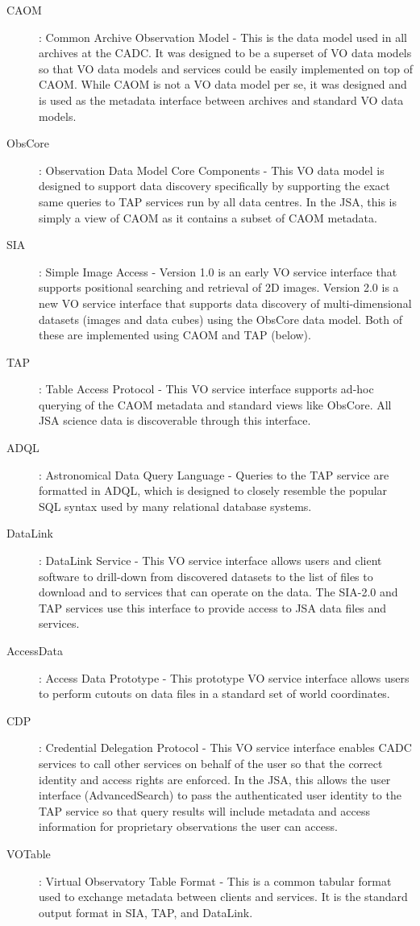 \documentclass[final,authoryear,5p,times,twocolumn]{elsarticle}
\begin{document}
\begin{description}
\item[CAOM] : Common Archive Observation Model - This is the data model
used in all archives at the CADC. It was designed to be a superset
of VO data models so that VO data models and services could be easily
implemented on top of CAOM. While CAOM is not a VO data model per se,
it was designed and is used as the metadata interface between archives
and standard VO data models. \citep{2007ASPC..376..347D}
\item[ObsCore] : Observation Data Model Core Components - This VO data model
is designed to support data discovery specifically by supporting the
exact same queries to TAP services run by all data centres. In the JSA,
this is simply a view of CAOM as it contains a subset of CAOM metadata. \citep{obscore}
\item[SIA] : Simple Image Access - Version 1.0 is an early VO service
interface that supports positional searching and retrieval of 2D images.
Version 2.0 is a new VO service interface that supports data discovery
of multi-dimensional datasets (images and data cubes) using the ObsCore
data model. Both of these are implemented using CAOM and TAP (below). \citep{tap}
\item[TAP] : Table Access Protocol - This VO service interface supports ad-hoc
querying of the CAOM metadata and standard views like ObsCore. All JSA
science data is discoverable through this interface. \citep{tap}
\item[ADQL] : Astronomical Data Query Language - Queries to the TAP service
are formatted in ADQL, which is designed to closely resemble the popular SQL
syntax used by many relational database systems. \citep{adql}
\item[DataLink] : DataLink Service - This VO service interface allows users
and client software to drill-down from discovered datasets to the list
of files to download and to services that can operate on the data. The
SIA-2.0 and TAP services use this interface to provide access to JSA
data files and services. \citep{datalink}
\item[AccessData] : Access Data Prototype - This prototype VO service interface
allows users to perform cutouts on data files in a standard set of
world coordinates.
\item[CDP] : Credential Delegation Protocol - This VO service interface enables
CADC services to call other services on behalf of the user so that the
correct identity and access rights are enforced. In the JSA, this allows
the user interface (AdvancedSearch) to pass the authenticated user
identity to the TAP service so that query results will include metadata
and access information for proprietary observations the user can access. \citep{cdp}
\item[VOTable] : Virtual Observatory Table Format - This is a common tabular
format used to exchange metadata between clients and services. It is
the standard output format in SIA, TAP, and DataLink. \citep{votable}
\end{description}
\end{document}
